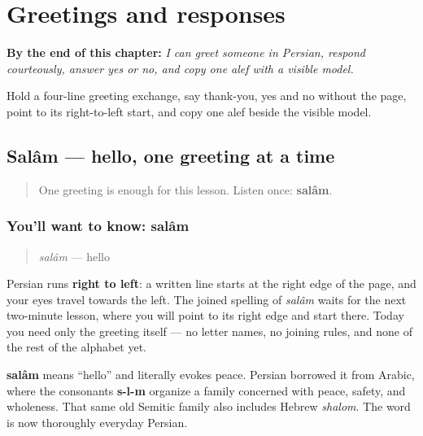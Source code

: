 
\chapter{Greetings and responses}
\label{ch:persian-greetings}

\begin{chapteropening}
\textbf{By the end of this chapter:} \emph{I can greet someone in Persian, respond courteously, answer yes or no, and copy one alef with a visible model.}

Hold a four-line greeting exchange, say thank-you, yes and no without the page, point to its right-to-left start, and copy one alef beside the visible model.
\end{chapteropening}

\section[\texorpdfstring{\fa{سلام} (salâm)}{سلام (salâm)}]{Salâm — hello, one greeting at a time}

\label{lesson:FA-C01-salam}



\begin{quote}
One greeting is enough for this lesson. Listen once: \textbf{salâm}.
\end{quote}

\subsection*{You'll want to know: salâm}
\begin{quote}
\emph{salâm} — hello
\end{quote}

Persian runs \textbf{right to left}: a written line starts at the right edge of the page, and your eyes travel towards the left. The joined spelling of \emph{salâm} waits for the next two-minute lesson, where you will point to its right edge and start there. Today you need only the greeting itself — no letter names, no joining rules, and none of the rest of the alphabet yet.

\begin{cousinweb}
\textbf{salâm} means “hello” and literally evokes peace. Persian borrowed it from Arabic, where the consonants \textbf{s-l-m} organize a family concerned with peace, safety, and wholeness. That same old Semitic family also includes Hebrew \emph{shalom}. The word is now thoroughly everyday Persian.
\end{cousinweb}

